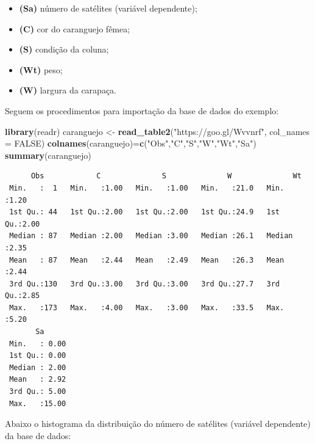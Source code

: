 \documentclass[12pt,brazil,oneside]{book}
\newenvironment{Shaded}{\begin{snugshade}}{\end{snugshade}}
\newcommand{\DataTypeTok}[1]{\textcolor[rgb]{0.13,0.29,0.53}{#1}}
\newcommand{\KeywordTok}[1]{\textcolor[rgb]{0.13,0.29,0.53}{\textbf{#1}}}
\newcommand{\NormalTok}[1]{#1}
\newcommand{\OperatorTok}[1]{\textcolor[rgb]{0.81,0.36,0.00}{\textbf{#1}}}
\newcommand{\OtherTok}[1]{\textcolor[rgb]{0.56,0.35,0.01}{#1}}
\newcommand{\StringTok}[1]{\textcolor[rgb]{0.31,0.60,0.02}{#1}}
\providecommand{\tightlist}{%
  \setlength{\itemsep}{0pt}\setlength{\parskip}{0pt}}
\begin{document}
\begin{itemize}
\tightlist
\item
  \textbf{(Sa)} número de satélites (variável dependente);
\item
  \textbf{(C)} cor do caranguejo fêmea;
\item
  \textbf{(S)} condição da coluna;
\item
  \textbf{(Wt)} peso;
\item
  \textbf{(W)} largura da carapaça.
\end{itemize}

Seguem os procedimentos para importação da base de dados do exemplo:

\begin{Shaded}
\begin{Highlighting}[]
\KeywordTok{library}\NormalTok{(readr)}
\NormalTok{caranguejo <-}\StringTok{ }\KeywordTok{read_table2}\NormalTok{(}\StringTok{"https://goo.gl/Wvvnrf"}\NormalTok{, }
    \DataTypeTok{col_names =} \OtherTok{FALSE}\NormalTok{)}
\KeywordTok{colnames}\NormalTok{(caranguejo)=}\KeywordTok{c}\NormalTok{(}\StringTok{"Obs"}\NormalTok{,}\StringTok{"C"}\NormalTok{,}\StringTok{"S"}\NormalTok{,}\StringTok{"W"}\NormalTok{,}\StringTok{"Wt"}\NormalTok{,}\StringTok{"Sa"}\NormalTok{)}
\KeywordTok{summary}\NormalTok{(caranguejo)}
\end{Highlighting}
\end{Shaded}

\begin{verbatim}
      Obs            C              S              W              Wt      
 Min.   :  1   Min.   :1.00   Min.   :1.00   Min.   :21.0   Min.   :1.20  
 1st Qu.: 44   1st Qu.:2.00   1st Qu.:2.00   1st Qu.:24.9   1st Qu.:2.00  
 Median : 87   Median :2.00   Median :3.00   Median :26.1   Median :2.35  
 Mean   : 87   Mean   :2.44   Mean   :2.49   Mean   :26.3   Mean   :2.44  
 3rd Qu.:130   3rd Qu.:3.00   3rd Qu.:3.00   3rd Qu.:27.7   3rd Qu.:2.85  
 Max.   :173   Max.   :4.00   Max.   :3.00   Max.   :33.5   Max.   :5.20  
       Sa       
 Min.   : 0.00  
 1st Qu.: 0.00  
 Median : 2.00  
 Mean   : 2.92  
 3rd Qu.: 5.00  
 Max.   :15.00  
\end{verbatim}

Abaixo o histograma da distribuição do número de satélites (variável
dependente) da base de dados:

\begin{Shaded}
\end{Shaded}
\end{document}
